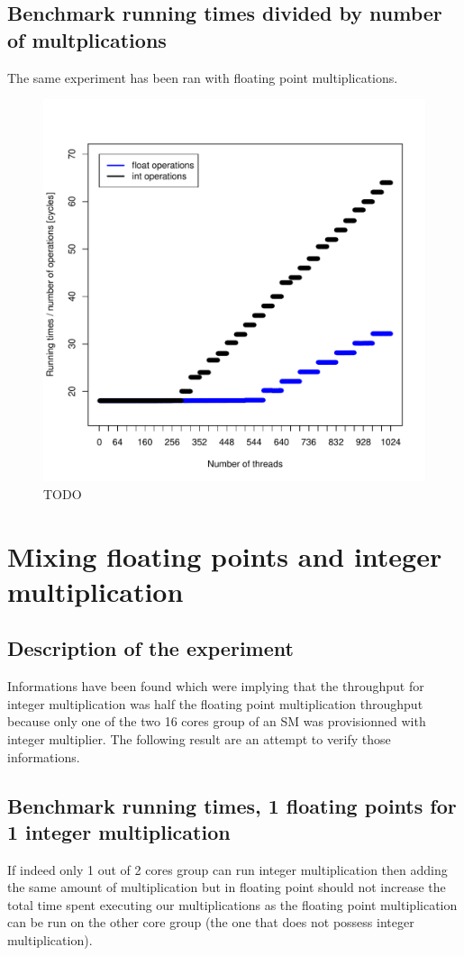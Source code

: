 \documentclass{article}
\begin{document}
	\subsection{Benchmark running times divided by number of multplications}
	The same experiment has been ran with floating point multiplications. 
	\begin{figure}[h]
		\centering
		\vspace{-20pt}
    			\includegraphics[width=.5\linewidth]{"graphics/latency_estimate"}
		\vspace{-20pt}
		\caption{TODO}
	\end{figure}
	\pagebreak

\section{Mixing floating points and integer multiplication}
	\subsection{Description of the experiment}
	Informations have been found which were implying that the throughput for integer multiplication was half the floating point multiplication throughput because only one of the two 16 cores group of an SM was provisionned with integer multiplier.
	The following result are an attempt to verify those informations.
	\subsection{Benchmark running times, 1 floating points for 1 integer multiplication}
	If indeed only 1 out of 2 cores group can run integer multiplication then adding the same amount of multiplication but in floating point should not increase the total time spent executing our multiplications as the floating point multiplication can be run on the other core group (the one that does not possess integer multiplication).
	
\end{document}
